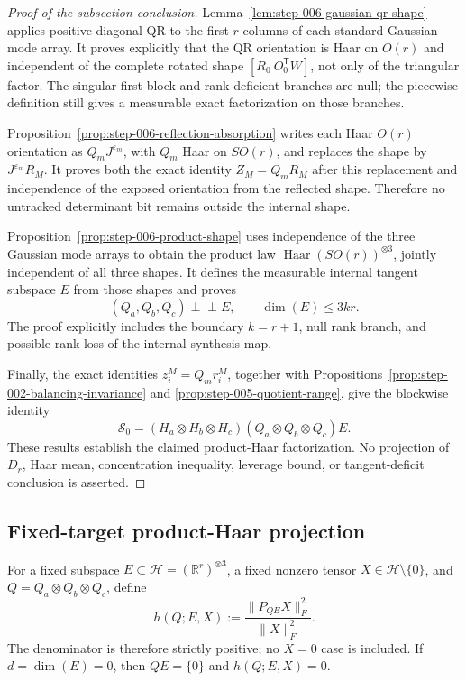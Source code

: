 \begin{proof}[Proof of the subsection conclusion]

Lemma~\ref{lem:step-006-gaussian-qr-shape} applies positive-diagonal QR to
the first \(r\) columns of each standard Gaussian mode array. It proves
explicitly that the QR orientation is Haar on \(O(r)\) and
independent of the complete rotated shape
\([R_0\ O_0^{\mathsf T}W]\), not only of the triangular factor. The singular
first-block and rank-deficient branches are null; the piecewise definition
still gives a measurable exact factorization on those branches.

Proposition~\ref{prop:step-006-reflection-absorption} writes each Haar
\(O(r)\) orientation as \(Q_mJ^{\varepsilon_m}\), with \(Q_m\) Haar on
\(SO(r)\), and replaces the shape by \(J^{\varepsilon_m}R_M\). It proves both
the exact identity \(Z_M=Q_mR_M\) after this replacement and independence of
the exposed orientation from the reflected shape. Therefore no untracked
determinant bit remains outside the internal shape.

Proposition~\ref{prop:step-006-product-shape} uses independence of the three
Gaussian mode arrays to obtain the product law
  \(\operatorname{Haar}(SO(r))^{\otimes3}\), jointly independent of all three
shapes. It defines the measurable internal tangent subspace \(E\) from those
shapes and proves
\[
  (Q_a,Q_b,Q_c)\perp\!\!\!\perp E,
  \qquad \dim(E)\le3kr.
\]
The proof explicitly includes the boundary \(k=r+1\), null rank branch, and
possible rank loss of the internal synthesis map.

Finally, the exact identities \(z_i^M=Q_mr_i^M\), together with
Propositions~\ref{prop:step-002-balancing-invariance} and
\ref{prop:step-005-quotient-range}, give the blockwise identity
\[
  \mathscr S_0
  =(H_a\otimes H_b\otimes H_c)
   (Q_a\otimes Q_b\otimes Q_c)E.
\]
These results establish the claimed product-Haar factorization. No
projection of \(D_r\), Haar mean, concentration inequality, leverage bound,
or tangent-deficit conclusion is asserted.

\end{proof}

\subsection{Fixed-target product-Haar projection}\label{app:step-007}

For a fixed subspace
\(E\subset\mathcal H=(\mathbb R^r)^{\otimes3}\), a fixed nonzero tensor
\(X\in\mathcal H\setminus\{0\}\), and
\(Q=Q_a\otimes Q_b\otimes Q_c\), define
\[
  h(Q;E,X):=\frac{\|P_{QE}X\|_F^2}{\|X\|_F^2}.
\]
The denominator is therefore strictly positive; no \(X=0\) case is included.
If \(d=\dim(E)=0\), then \(QE=\{0\}\) and \(h(Q;E,X)=0\).

